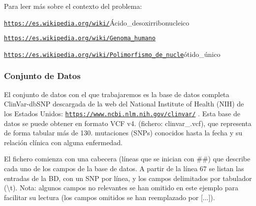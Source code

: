 Para leer más sobre el contexto del problema\+: \begin{DoxyItemize}
\item \href{https://es.wikipedia.org/wiki/}{\tt https\+://es.\+wikipedia.\+org/wiki/}Ácido\+\_\+desoxirribonucleico \item \href{https://es.wikipedia.org/wiki/Genoma_humano}{\tt https\+://es.\+wikipedia.\+org/wiki/\+Genoma\+\_\+humano} \item \href{https://es.wikipedia.org/wiki/Polimorfismo_de_nucle}{\tt https\+://es.\+wikipedia.\+org/wiki/\+Polimorfismo\+\_\+de\+\_\+nucle}ótido\+\_\+único\end{DoxyItemize}
\hypertarget{index_baseDatos}{}\subsubsection{Conjunto de Datos}\label{index_baseDatos}
El conjunto de datos con el que trabajaremos es la base de datos completa Clin\+Var-\/db\+S\+NP descargada de la web del National Institute of Health (N\+IH) de los Estados Unidos\+: \href{https://www.ncbi.nlm.nih.gov/clinvar/}{\tt https\+://www.\+ncbi.\+nlm.\+nih.\+gov/clinvar/} . Esta base de datos se puede obtener en formato V\+CF v4. (fichero\+: clinvar\+\_.\+vcf), que representa de forma tabular más de 130. mutaciones (S\+N\+Ps) conocidos hasta la fecha y su relación clínica con alguna enfermedad.

El fichero comienza con una cabecera (líneas que se inician con \textquotesingle{}\#\#\textquotesingle{}) que describe cada uno de los campos de la base de datos. A partir de la línea 67 se listan las entradas de la BD, con un S\+NP por línea, y los campos delimitados por tabulador (\textquotesingle{}\textbackslash{}t\textquotesingle{}). Nota\+: algunos campos no relevantes se han omitido en este ejemplo para facilitar su lectura (los campos omitidos se han reemplazado por \mbox{[}...\mbox{]}).


